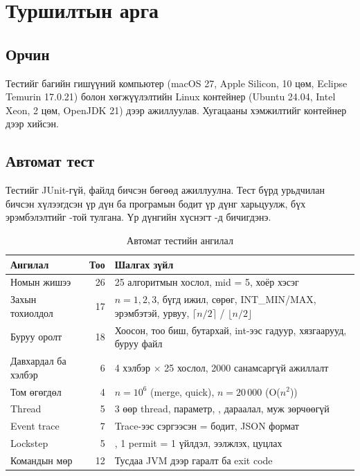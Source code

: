 \chapter{Туршилтын арга}\label{ch:method}

\section{Орчин}
Тестийг багийн гишүүний компьютер (macOS 27, Apple Silicon, 10 цөм, Eclipse Temurin 17.0.21) болон хөгжүүлэлтийн
Linux контейнер (Ubuntu 24.04, Intel Xeon, 2 цөм, OpenJDK 21) дээр ажиллуулав. Хугацааны хэмжилтийг контейнер дээр хийсэн.

\section{Автомат тест}
Тестийг JUnit-гүй,  файлд бичсэн бөгөөд  ажиллуулна. Тест бүрд
урьдчилан бичсэн хүлээгдсэн үр дүн ба програмын бодит үр дүнг харьцуулж, бүх эрэмбэлэлтийг -той
тулгана. Үр дүнгийн хүснэгт -д бичигдэнэ.

\begin{table}[H]
\centering\small
\caption{Автомат тестийн ангилал}\label{tab:tests}
\begin{tabularx}{\linewidth}{@{}lrY@{}}
\toprule
Ангилал & Тоо & Шалгах зүйл \\
\midrule
Номын жишээ & 26 & 25 алгоритмын хослол, mid = 5, хоёр хэсэг \\
Захын тохиолдол & 17 & $n = 1, 2, 3$, бүгд ижил, сөрөг, INT\_MIN/MAX, эрэмбэтэй, урвуу, $\lceil n/2\rceil$ / $\lfloor n/2\rfloor$ \\
Буруу оролт & 18 & Хоосон, тоо биш, бутархай, int-ээс гадуур, хязгаарууд, буруу файл \\
Давхардал ба хэлбэр & 6 & 4 хэлбэр × 25 хослол, 2000 санамсаргүй ажиллалт \\
Том өгөгдөл & 4 & $n = 10^6$ (merge, quick), $n = 20\,000$ (O($n^2$)) \\
Thread & 5 & 3 өөр thread, параметр, , дараалал, муж зөрчөөгүй \\
Event trace & 7 & Trace-ээс сэргээсэн  = бодит, JSON формат \\
Lockstep & 5 & , 1 permit = 1 үйлдэл, ээлжлэх, цуцлах \\
Командын мөр & 12 & Тусдаа JVM дээр гаралт ба exit code \\
\bottomrule
\end{tabularx}
\end{table}

